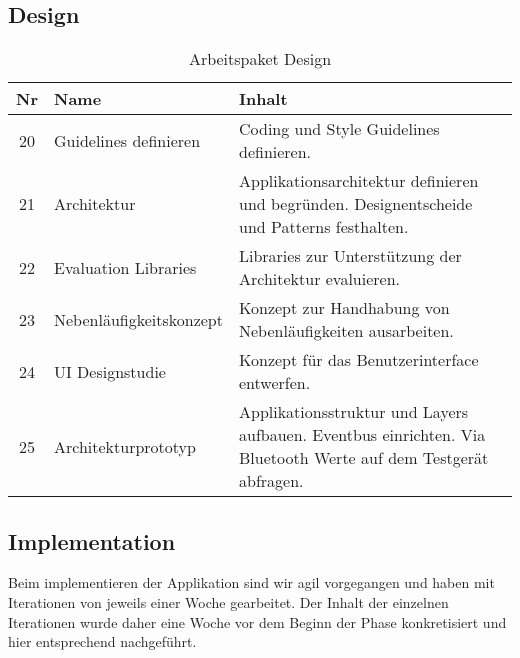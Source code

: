 \subsection{Design}
\begin{table}[H]
\begin{tabularx}{\textwidth}{ c | l | X }
\textbf{Nr} & \textbf{Name} & \textbf{Inhalt} \\ \hline
20 & Guidelines definieren & Coding und Style Guidelines definieren.\\ \hline
21 & Architektur & Applikationsarchitektur definieren und begründen. Designentscheide und Patterns festhalten.\\ \hline
22 & Evaluation Libraries & Libraries zur Unterstützung der Architektur evaluieren.\\ \hline
23 & Nebenläufigkeitskonzept & Konzept zur Handhabung von Nebenläufigkeiten ausarbeiten.\\ \hline
24 & UI Designstudie & Konzept für das Benutzerinterface entwerfen.\\ \hline
25 & Architekturprototyp & Applikationsstruktur und Layers aufbauen. Eventbus einrichten. Via Bluetooth Werte auf dem Testgerät abfragen.\\ 
\end{tabularx}
\caption{Arbeitspaket Design}
\end{table}

\pagebreak
\subsection{Implementation}

Beim implementieren der Applikation sind wir agil vorgegangen und haben mit Iterationen von jeweils einer Woche gearbeitet. Der Inhalt der einzelnen Iterationen wurde daher eine Woche vor dem Beginn der Phase konkretisiert und hier entsprechend nachgeführt.

